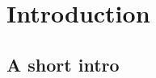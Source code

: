








\section{Introduction}
	\subsection{A short intro}
	




\appendix
\renewcommand{\theHsection}{appendix.\thesection}


